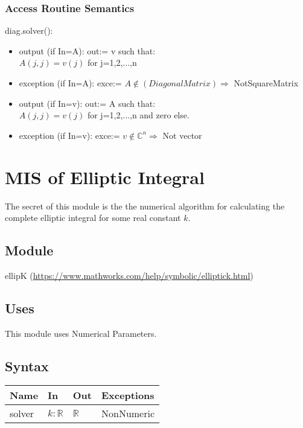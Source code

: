 \documentclass[12pt, titlepage]{article}
\begin{document}
\subsubsection{Access Routine Semantics}

\noindent diag.solver():
\begin{itemize}
	\item output (if In=A): out:= v such that:\\
	$A(j,j) = v(j)$ for j=1,2,...,n \\
	\item exception (if In=A): exce:= $A \not\in (Diagonal Matrix) \Rightarrow$ 
	NotSquareMatrix 
	\item output (if In=v): out:= A such that:\\
	$A(j,j) = v(j)$ for j=1,2,...,n and zero else. \\
	\item exception (if In=v): exce:= $v \not\in \mathbb{C}^{n} \Rightarrow$ 
	Not vector 
\end{itemize}

\newpage 

\section{MIS of Elliptic Integral} 

The secret of this module is the the numerical algorithm for calculating the 
complete 
elliptic integral for some real constant $k$.

\subsection{Module}

ellipK (\url{https://www.mathworks.com/help/symbolic/elliptick.html})

\subsection{Uses}

This module uses Numerical Parameters. 

\subsection{Syntax}

\begin{center}
	\begin{tabular}{p{2cm} p{6cm} p{6cm} p{3cm}}
		\hline
		\textbf{Name} & \textbf{In} & \textbf{Out} & \textbf{Exceptions} \\
		\hline
		solver & $k : \mathbb{R}$ & $\mathbb{R}$ & 
		NonNumeric \\ 
		\hline
	\end{tabular}
\end{center}
\end{document}
